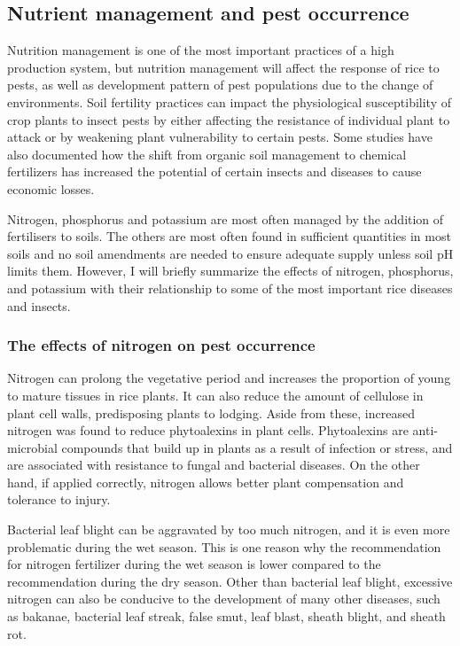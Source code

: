\documentclass[12pt, oneside]{report}
\begin{document}
\subsection*{Nutrient management and pest occurrence}

Nutrition management is one of the most important practices of a high production system, but nutrition management will affect the response of rice to pests, as well as development pattern of pest populations due to the change of environments. Soil fertility practices can impact the physiological susceptibility of crop plants to insect pests by either affecting the resistance of individual plant to attack or by weakening plant vulnerability to certain pests. Some studies have also documented how the shift from organic soil management to chemical fertilizers has increased the potential of certain insects and diseases to cause economic losses.

Nitrogen, phosphorus and potassium are most often managed by the addition of fertilisers to soils. The others are most often found in sufficient quantities in most soils and no soil amendments are needed to ensure adequate supply unless soil pH limits them. However, I will briefly summarize the effects of nitrogen, phosphorus, and potassium with their relationship to some of the most important rice diseases and insects.

\subsubsection{The effects of nitrogen on pest occurrence}

Nitrogen can prolong the vegetative period and increases the proportion of young to mature tissues in rice plants. It can also reduce the amount of cellulose in plant cell walls, predisposing plants to lodging. Aside from these, increased nitrogen was found to reduce phytoalexins in plant cells. Phytoalexins are anti-microbial compounds that build up in plants as a result of infection or stress, and are associated with resistance to fungal and bacterial diseases. On the other hand, if applied correctly, nitrogen allows better plant compensation and tolerance to injury.

Bacterial leaf blight can be aggravated by too much nitrogen, and it is even more problematic during the wet season. This is one reason why the recommendation for nitrogen fertilizer during the wet season is lower compared to the recommendation during the dry season. Other than bacterial leaf blight, excessive nitrogen can also be conducive to the development of many other diseases, such as bakanae, bacterial leaf streak, false smut, leaf blast, sheath blight, and sheath rot.
\end{document}
